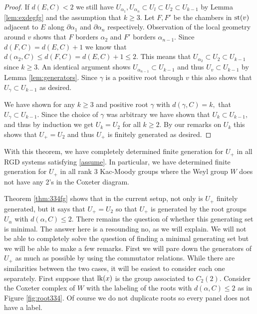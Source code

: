 \documentclass[class=book, crop=false]{standalone}
\begin{document}
\begin{proof}
	If $d(E,C)<2$ we still have $U_{\alpha_1},U_{\alpha_n}\subset U_l\subset U_2\subset U_{k-1}$ by Lemma \ref{lem:exdegfg} and the assumption that $k\ge 3.$ Let $F,F'$ be the chambers in $\mathrm{st}(v)$ adjacent to $E$ along $\partial\alpha_1$ and $\partial\alpha_n$ respectively. Observation of the local geometry around $v$ shows that $F$ borders $\alpha_2$ and $F'$ borders $\alpha_{n-1}.$ Since $d(F,C)=d(E,C)+1$ we know that $d(\alpha_2,C)\le d(F,C)=d(E,C)+1\le 2.$ This means that $U_{\alpha_2}\subset U_2\subset U_{k-1}$ since $k\ge 3.$ An identical argument shows $U_{\alpha_{n-1}}\subset U_{k-1}$ and thus $U_v\subset U_{k-1}$ by Lemma \ref{lem:generators}. Since $\gamma$ is a positive root through $v$ this also shows that $U_\gamma \subset U_{k-1}$ as desired.

	We have shown for any $k\ge 3$ and positive root $\gamma$ with $d(\gamma,C)=k,$ that $U_\gamma\subset U_{k-1}.$ Since the choice of $\gamma$ was arbitrary we have shown that $U_k\subset U_{k-1},$ and thus by induction we get $U_k=U_2$ for all $k\ge 2.$ By our remarks on $U_k$ this shows that $U_+=U_2$ and thus $U_+$ is finitely generated as desired.
\end{proof}

With this theorem, we have completely determined finite generation for $U_+$ in all RGD systems satisfying \eqref{assume}. In particular, we have determined finite generation for $U_+$ in all rank 3 Kac-Moody groups where the Weyl group $W$ does not have any 2's in the Coxeter diagram. 

Theorem \ref{thm:334fg} shows that in the current setup, not only is $U_+$ finitely generated, but it says that $U_+=U_2$ so that $U_+$ is generated by the root groups $U_\alpha$ with $d(\alpha,C)\le 2.$ There remains the question of whether this generating set is minimal. The answer here is a resounding no, as we will explain. We will not be able to completely solve the question of finding a minimal generating set but we will be able to make a few remarks. First we will pare down the generators of $U_+$ as much as possible by using the commutator relations. While there are similarities between the two cases, it will be easiest to consider each one separately. First suppose that $\mathrm{lk}(x)$ is the group associated to $C_2(2).$ Consider the Coxeter complex of $W$ with the labeling of the roots with $d(\alpha,C)\le 2$ as in Figure \ref{fig:root334}. Of course we do not duplicate roots so every panel does not have a label.
\end{document}
